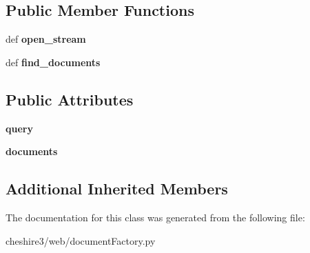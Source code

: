 \subsection*{Public Member Functions}
\begin{DoxyCompactItemize}
\item 
\hypertarget{classcheshire3_1_1web_1_1document_factory_1_1_oai_document_stream_1_1_opensearch_document_stream_abb2031eab73bb135f00b22d1d5faebe9}{def {\bfseries open\-\_\-stream}}\label{classcheshire3_1_1web_1_1document_factory_1_1_oai_document_stream_1_1_opensearch_document_stream_abb2031eab73bb135f00b22d1d5faebe9}

\item 
\hypertarget{classcheshire3_1_1web_1_1document_factory_1_1_oai_document_stream_1_1_opensearch_document_stream_abfaa39bc7e89149a64a579953f16162e}{def {\bfseries find\-\_\-documents}}\label{classcheshire3_1_1web_1_1document_factory_1_1_oai_document_stream_1_1_opensearch_document_stream_abfaa39bc7e89149a64a579953f16162e}

\end{DoxyCompactItemize}
\subsection*{Public Attributes}
\begin{DoxyCompactItemize}
\item 
\hypertarget{classcheshire3_1_1web_1_1document_factory_1_1_oai_document_stream_1_1_opensearch_document_stream_a2ba89472706153ac11ba6997a03d961e}{{\bfseries query}}\label{classcheshire3_1_1web_1_1document_factory_1_1_oai_document_stream_1_1_opensearch_document_stream_a2ba89472706153ac11ba6997a03d961e}

\item 
\hypertarget{classcheshire3_1_1web_1_1document_factory_1_1_oai_document_stream_1_1_opensearch_document_stream_a18a204bba30884860c338d236253c452}{{\bfseries documents}}\label{classcheshire3_1_1web_1_1document_factory_1_1_oai_document_stream_1_1_opensearch_document_stream_a18a204bba30884860c338d236253c452}

\end{DoxyCompactItemize}
\subsection*{Additional Inherited Members}


The documentation for this class was generated from the following file\-:\begin{DoxyCompactItemize}
\item 
cheshire3/web/document\-Factory.\-py\end{DoxyCompactItemize}
